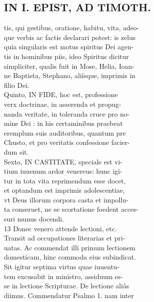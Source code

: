 \documentclass{article}
\begin{document}
\begin{pages}
\section*{IN I. EPIST, AD TIMOTH. \\
                }
tis, qui gestibus, oratione, habitu, vita, adeo- \\
                que verbis ac factis declarari potest: is zelus \\
                quia singularis est motus spiritus Dei agen- \\
                tis in hominibus piis, ideo Spiritus dicitur \\
                simpliciter, qualis fuit in Mose, Helia, Ioan- \\
                ne Baptista, Stephano, aliísque, imprimis in \\
                filio Dei. \\
                Quinto, IN FIDE, hoc est, professione \\
                verx doctrinae, in asserenda et propug- \\
                nanda veritate, in toleranda cruce pro no- \\
                mine Dei : in his certaminibus praebeat \\
                eremplum suis auditoribus, quantum pre \\
                Chusto, et pro veritatis confessione facier- \\
                dum sit. \\
                Sexto, IN CASTITATE, speciale est vi- \\
                tium iuuenum ardor venereus: hunc igi- \\
                tur in tota vita reprimendum esse docet, \\
                et optandum est imprimis adolescentiae, \\
                vt Deus illorum corpora casta et impollu- \\
                ta conseruet, ne se scortatione foedent acces- \\
                suri munus docendi. \\
                13 Donec venero attende lectioni, etc. \\
                Transit ad occupationes literarias et pri- \\
                uatas. Ac commendat illi primum lectionem \\
                domesticam, hinc commoda eius subindicat. \\
                Sit igitur septima virtus quae iuuentu- \\
                tem excusabit in ministro, assiduum es- \\
                se in lectione Scripturae. De lectione aliâs \\
                diimus. Commendatur Psalmo 1. nam inter \\
                

\end{pages}
\end{document}
